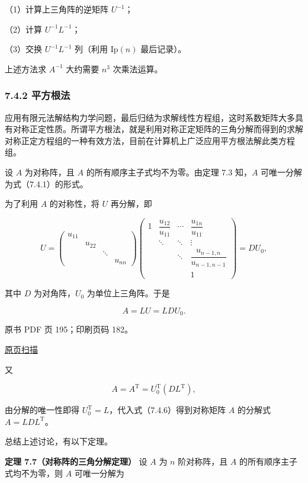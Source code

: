 （1）计算上三角阵的逆矩阵 \(U^{-1}\)；

（2）计算 \(U^{-1}L^{-1}\)；

（3）交换 \(U^{-1}L^{-1}\) 列（利用 \(\mathrm{Ip}(n)\) 最后记录）。

上述方法求 \(A^{-1}\) 大约需要 \(n^3\) 次乘法运算。

\subsubsection{7.4.2 平方根法}\label{ch07a-ux5e73ux65b9ux6839ux6cd5}

应用有限元法解结构力学问题，最后归结为求解线性方程组，这时系数矩阵大多具有对称正定性质。所谓平方根法，就是利用对称正定矩阵的三角分解而得到的求解对称正定方程组的一种有效方法，目前在计算机上广泛应用平方根法解此类方程组。

设 \(A\) 为对称阵，且 \(A\) 的所有顺序主子式均不为零。由定理 7.3 知，\(A\) 可唯一分解为式（7.4.1）的形式。

为了利用 \(A\) 的对称性，将 \(U\) 再分解，即

\[
U=\begin{pmatrix}
u_{11}&&&\\
&u_{22}&&\\
&&\ddots&\\
&&&u_{nn}
\end{pmatrix}
\begin{pmatrix}
1&\dfrac{u_{12}}{u_{11}}&\cdots&\dfrac{u_{1n}}{u_{11}}\\
&\ddots&\ddots&\vdots\\
&&\ddots&\dfrac{u_{n-1,n}}{u_{n-1,n-1}}\\
&&&1
\end{pmatrix}=DU_0,
\]

其中 \(D\) 为对角阵，\(U_0\) 为单位上三角阵。于是

\[A=LU=LDU_0.\tag{7.4.6}\]

\clearpage

原书 PDF 页 195；印刷页码 182。

\href{source-images/pdf-195.jpeg}{原页扫描}

又

\[A=A^{\mathrm T}=U_0^{\mathrm T}(DL^{\mathrm T}),\]

由分解的唯一性即得 \(U_0^{\mathrm T}=L\)，代入式（7.4.6）得到对称矩阵 \(A\) 的分解式 \(A=LDL^{\mathrm T}\)。

总结上述讨论，有以下定理。

\textbf{定理 7.7（对称阵的三角分解定理）} 设 \(A\) 为 \(n\) 阶对称阵，且 \(A\) 的所有顺序主子式均不为零，则 \(A\) 可唯一分解为

